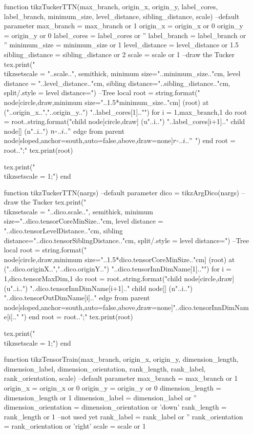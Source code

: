 \begin{luacode*}
	function tikzTuckerTTN(max_branch, origin_x, origin_y, label_cores, label_branch, minimum_size, level_distance, sibling_distance, scale)
	  --default parameter
	  max_branch = max_branch or 1
	  origin_x = origin_x or 0
	  origin_y = origin_y or 0
	  label_cores = label_cores or ''
	  label_branch = label_branch or ''
	  minimum_size = minimum_size or 1
	  level_distance = level_distance or 1.5
	  sibling_distance = sibling_distance or 2
	  scale = scale or 1
	  --draw the Tucker
	  tex.print("\\tikzset{scale = "..scale..", semithick, minimum size="..minimum_size.."cm, level distance = "..level_distance.."cm, sibling distance="..sibling_distance.."cm, split/.style = {level distance=}}")
	  --Tree
	  local root = string.format("\\node[circle,draw,minimum size="..1.5*minimum_size.."cm] (root) at ("..origin_x..","..origin_y..") {"..label_cores[1].."}")
	  for i = 1,max_branch,1 do 
		root = root..string.format("child { node[circle,draw] (u"..i..") {"..label_cores[i+1].."} child { node[] (n"..i..") {$n_"..i.."$} } edge from parent node[sloped,anchor=south,auto=false,above,draw=none]{$r_"..i.."$} }")
	  end
	  root = root..";"
	  tex.print(root)
	  
	  tex.print("\\tikzset{scale = 1};")
	end

	function tikzTuckerTTN(nargs)
	  --default parameter
	  dico = tikzArgDico(nargs)
	  --draw the Tucker
	  tex.print("\\tikzset{scale = "..dico.scale..", semithick, minimum size="..dico.tensorCoreMinSize.."cm, level distance = "..dico.tensorLevelDistance.."cm, sibling distance="..dico.tensorSiblingDistance.."cm, split/.style = {level distance=}}")
	  --Tree
	  local root = string.format("\\node[circle,draw,minimum size="..1.5*dico.tensorCoreMinSize.."cm] (root) at ("..dico.originX..","..dico.originY..") {"..dico.tensorInnDimName[1].."}")
	  for i = 1,dico.tensorMaxDim,1 do 
		root = root..string.format("child { node[circle,draw] (u"..i..") {"..dico.tensorInnDimName[i+1].."} child { node[] (n"..i..") {"..dico.tensorOutDimName[i].."} } edge from parent node[sloped,anchor=south,auto=false,above,draw=none]{"..dico.tensorInnDimName[i].."} }")
	  end
	  root = root..";"
	  tex.print(root)
	  
	  tex.print("\\tikzset{scale = 1};")
	end
  
	function tikzTensorTrain(max_branch, origin_x, origin_y, dimension_length, dimension_label, dimension_orientation, rank_length, rank_label, rank_orientation, scale)
	  --default parameter
	  max_branch = max_branch or 1
	  origin_x = origin_x or 0
	  origin_y = origin_y or 0
	  dimension_length = dimension_length or 1
	  dimension_label = dimension_label or ''
	  dimension_orientation = dimension_orientation or 'down'
	  rank_length = rank_length or 1 --not used yet
	  rank_label = rank_label or ''
	  rank_orientation = rank_orientation or 'right'
	  scale = scale or 1
	  

\end{luacode*}

